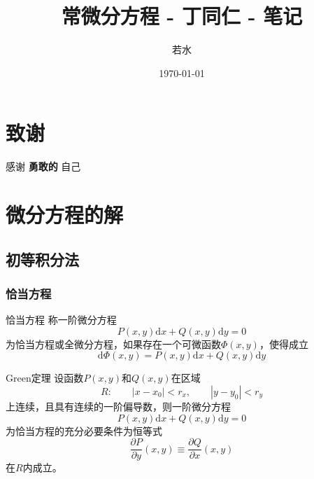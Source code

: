 \documentclass[lang = cn, scheme = chinese, thmcnt = section]{elegantbook}
\title{常微分方程 - 丁同仁 - 笔记}                %
\author{若水}                        %
\date{\today}                       %
\begin{document}
\maketitle       %

\frontmatter     %

\chapter*{致谢}


\vspace*{\fill}
\begin{center}
	
	\large{感谢 \textbf{ 勇敢的 } 自己}
	
\end{center}
\vspace*{\fill}

\tableofcontents %

\mainmatter      %

\chapter{微分方程的解}

\section{初等积分法}

\subsection{恰当方程}

\begin{definition}{恰当方程}
	称一阶微分方程
	$$
	P(x,y)\mathrm{d}{x} +Q(x,y)\mathrm{d}{y} =0
	$$
	为恰当方程或全微分方程，如果存在一个可微函数$\Phi(x,y)$，使得成立
	$$
	\mathrm{d}{\Phi(x,y)}=P(x,y)\mathrm{d}{x} +Q(x,y)\mathrm{d}{y}
	$$
\end{definition}

\begin{theorem}{Green定理}
	设函数$P(x,y)$和$Q(x,y)$在区域
	$$
	R:\qquad 
	|x-x_0|<r_x,\qquad |y-y_0|<r_y
	$$
	上连续，且具有连续的一阶偏导数，则一阶微分方程
	$$
	P(x,y)\mathrm{d}{x} +Q(x,y)\mathrm{d}{y} =0
	$$
	为恰当方程的充分必要条件为恒等式
	$$
	\frac{\partial P}{\partial y}(x,y)\equiv\frac{\partial Q}{\partial x}(x,y)
	$$
	在$R$内成立。
\end{theorem}
\end{document}
